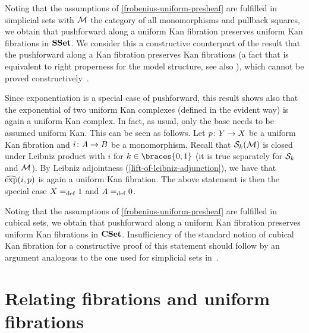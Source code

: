 \documentclass[reqno,10pt,a4paper,oneside,draft]{amsart}
\begin{document}
{{\begin{example}
Noting that the assumptions of \cref{frobenius-uniform-presheaf} are fulfilled in simplicial sets with $\cal{M}$ the category of all
monomorphisms and pullback squares, we obtain that pushforward along a uniform Kan fibration preserves uniform Kan fibrations in $\SSet$.
We consider this a constructive counterpart of the result that the pushforward along a Kan fibration preserves Kan fibrations (a fact that is equivalent to right properness for the model structure, see also \cite[Lemma 4.3.1]{voevodsky-simplicial-model}), which cannot be proved constructively~\cite{coquand-non-constructivity-kan}.

Since exponentiation is a special case of pushforward, this result shows also that the exponential of two uniform Kan complexes (defined in the evident way) is again a uniform Kan complex.
In fact, as usual, only the base needs to be assumed uniform Kan.
This can be seen as follows.
Let $p \co Y \to X$ be a uniform Kan fibration and $i \co A \to B$ be a monomorphism.
Recall that $\cal{S}_k(\cal{M})$ is closed under Leibniz product with $i$ for $k \in \braces{0, 1}$ (it is true separately for $\cal{S}_k$ and $\cal{M}$).
By Leibniz adjointness (\cref{lift-of-leibniz-adjunction}), we have that $\hatexp(i, p)$ is again a uniform Kan fibration.
The above statement is then the special case $X \defeq 1$ and $A \defeq 0$.
\end{example}

\begin{example}
Noting that the assumptions of \cref{frobenius-uniform-presheaf} are fulfilled in cubical sets, we obtain that pushforward along a uniform Kan fibration preserves uniform Kan fibrations in $\CSet$.
Insufficiency of the standard notion of cubical Kan fibration for a constructive proof of this statement should follow by an argument analogous to the one used for simplicial sets in~\cite{coquand-non-constructivity-kan}.
\end{example}


\newpage

\section{Relating fibrations and uniform fibrations}
\label{sec:non-alg}

}}
\end{document}
